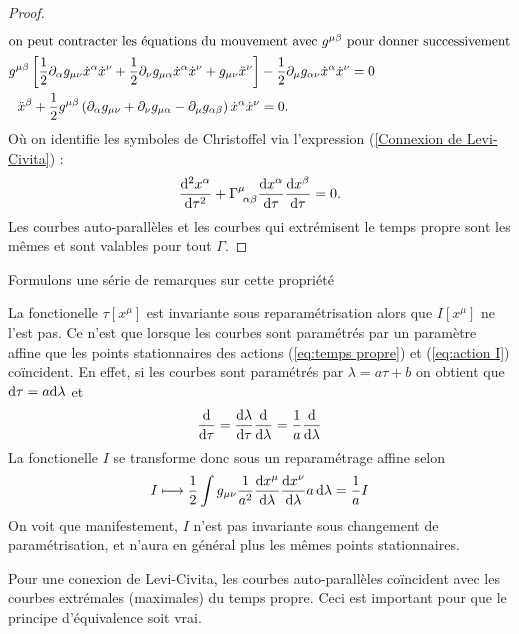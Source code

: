 \begin{proof}
\begin{align}
    \intertext{on peut contracter les équations du mouvement avec           $g^{\mu \beta}$ pour donner successivement}
        g^{\mu \beta} \left[\frac{1}{2}\partial_{\alpha}g_{\mu \nu} \dot{x}^{\alpha}\dot{x}^{\nu} + \frac{1}{2}\partial_{\nu}g_{\mu \alpha}\dot{x}^{\alpha}\dot{x}^{\nu} + g_{\mu \nu}\ddot{x}^{\nu} \right]  &- \frac{1}{2}\partial_{\mu}g_{\alpha \nu}\dot{x}^{\alpha}\dot{x}^{\nu} = 0\\
        \ddot{x}^{\beta} + \frac{1}{2}g^{\mu \beta} \left(\partial_{\alpha}g_{\mu \nu} + \partial_{\nu}g_{\mu \alpha} - \partial_{\mu}g_{\alpha \beta}\right) \dot{x}^{\alpha}\dot{x}^{\nu} &= 0.
    \end{align}
    Où on identifie les symboles de Christoffel via l'expression (\ref{Connexion de Levi-Civita}) :
    \begin{equation}
        \frac{\td^2 x^{\alpha}}{\td\tau^2 } + \Gamma\indices{^{\mu}_{\!\alpha \beta}} \frac{\td x^{\alpha}}{\td\tau} \frac{\td x^{\beta}}{\td \tau} = 0.
    \end{equation}
    Les courbes auto-parallèles et les courbes qui extrémisent le temps propre sont les mêmes et sont valables pour tout $\Gamma$.
\end{proof}
Formulons une série de remarques sur cette propriété
\begin{rmk}
    La fonctionelle $\tau[x^\mu]$ est invariante sous reparamétrisation alors que $I[x^\mu]$ ne l'est pas. Ce n'est que lorsque les courbes sont paramétrés par un paramètre affine que les points stationnaires des actions (\ref{eq:temps propre}) et (\ref{eq:action I}) coïncident. En effet, si les courbes sont paramétrés par $\lambda = a\tau + b$  on obtient que  $\mathrm{d}\tau = a \mathrm{d}\lambda$ et 
    \begin{equation}
    \frac{\mathrm{d}}{\mathrm{d}\tau} = \frac{\mathrm{d}\lambda}{\mathrm{d}\tau}\frac{\mathrm{d}}{\mathrm{d}\lambda} = \frac{1}{a}\frac{\mathrm{d}}{\mathrm{d}\lambda}
    \end{equation}
    La fonctionelle $I$ se transforme donc sous un reparamétrage affine selon
    \begin{equation}
        I \longmapsto \frac{1}{2}\int g_{\mu \nu}\frac{1}{a^2}\frac{\mathrm{d} x^{\mu}}{\mathrm{d}\lambda}\frac{\mathrm{d} x^{\nu}}{\mathrm{d}\lambda} a \,\mathrm{d}\lambda = \frac{1}{a}I
    \end{equation}
    On voit que manifestement, $I$ n'est pas invariante sous changement de paramétrisation, et n'aura en général plus les mêmes points stationnaires.
\end{rmk}
\cutebreak
\begin{rmk}
    Pour une conexion de Levi-Civita, les courbes auto-parallèles coïncident avec les courbes extrémales (maximales) du temps propre. Ceci est important pour que le principe d'équivalence soit vrai.
\end{rmk}
